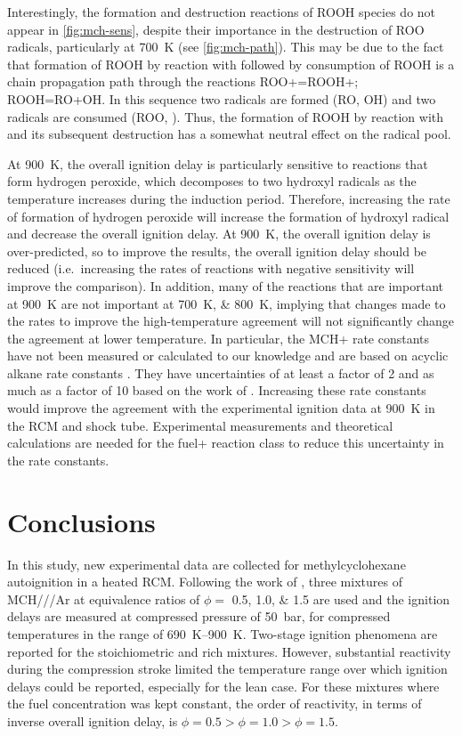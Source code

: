 \documentclass[../main.tex]{subfiles}
\begin{document}
Interestingly, the formation and destruction reactions of ROOH species
do not appear in \cref{fig:mch-sens}, despite their importance in
the destruction of ROO radicals, particularly at \SI{700}{\kelvin}
(see \cref{fig:mch-path}). This may be due to the fact that
formation of ROOH by reaction with  followed by consumption of ROOH
is a chain propagation path through the reactions ROO+=ROOH+;
ROOH=RO+OH. In this sequence two radicals are formed (RO, OH) and two
radicals are consumed (ROO, ). Thus, the formation of ROOH by
reaction with  and its subsequent destruction has a somewhat
neutral effect on the radical pool.

At \SI{900}{\kelvin}, the overall ignition delay is particularly sensitive
to reactions that form hydrogen peroxide, which decomposes to two
hydroxyl radicals as the temperature increases during the induction
period. Therefore, increasing the rate of formation of hydrogen peroxide
will increase the formation of hydroxyl radical and decrease the overall
ignition delay. At \SI{900}{\kelvin}, the overall ignition delay is
over-predicted, so to improve the results, the overall ignition delay
should be reduced (i.e.\ increasing the rates of reactions with negative
sensitivity will improve the comparison). In addition, many of the
reactions that are important at \SI{900}{\kelvin} are not important at
\SIlist{700;800}{\kelvin}, implying that changes made to the rates to
improve the high-temperature agreement will not significantly change the
agreement at lower temperature. In particular, the MCH+ rate constants
have not been measured or calculated to our knowledge and are based
on acyclic alkane rate constants \cite{Aguilera-Iparraguirre2008}. They have uncertainties of at
least a factor of \num{2} and as much as a factor of \num{10} based on the work
of \textcite{Aguilera-Iparraguirre2008}. Increasing these rate constants
would improve the agreement with the experimental ignition data at
\SI{900}{\kelvin} in the RCM and shock tube. Experimental measurements
and theoretical calculations are needed for the fuel+ reaction class to
reduce this uncertainty in the rate constants.

\section{Conclusions}

In this study, new experimental data are collected for methylcyclohexane
autoignition in a heated RCM. Following the work
of \textcite{Mittal2009}, three mixtures of MCH///\allowbreak Ar at equivalence
ratios of $\phi=$ \numlist{0.5;1.0;1.5} are used and the ignition delays
are measured at compressed pressure of \SI{50}{\bar}, for compressed
temperatures in the range of \SIrange{690}{900}{\kelvin}. Two-stage
ignition phenomena are reported for the stoichiometric and rich
mixtures. However, substantial reactivity during the compression
stroke limited the temperature range over which ignition delays could
be reported, especially for the lean case. For these mixtures where the
fuel concentration was kept constant, the order of reactivity, in terms
of inverse overall ignition delay, is $\phi=\num{0.5}>\phi=\num{1.0}>\phi=\num{1.5}$.
\end{document}
